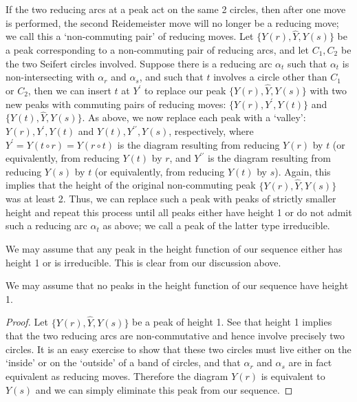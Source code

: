 If the two reducing arcs at a peak act on the same 2 circles, then after one move is performed, the second Reidemeister move will no longer be a reducing move; we call this a ‘non-commuting pair’ of reducing moves. Let $\{Y(r), \hat{Y}, Y(s) \}$ be a peak corresponding to a non-commuting pair of reducing arcs, and let $C_1, C_2$ be the two Seifert circles involved. Suppose there is a reducing arc $\alpha_t$ such that $\alpha_t$ is non-intersecting with $\alpha_r$ and $\alpha_s$, and such that $t$ involves a circle other than $C_1$ or $C_2$, then we can insert $t$ at $Y^{\prime}$ to replace our peak $\{Y(r), \hat{Y}, Y(s) \}$  with two new peaks with commuting pairs of reducing moves: $\{Y(r), Y^{\prime}, Y(t)\}$ and $\{Y (t), \hat{Y}, Y (s)\}$.
As above, we now replace each peak with a ‘valley’: ${Y (r), Y^{\prime}, Y (t)}$ and ${Y (t), Y^{\prime\prime}, Y (s)}$, respectively, where $Y^{\prime}= Y (t \circ r) = Y (r \circ t)$ is the diagram resulting from reducing $Y(r)$ by
$t$ (or equivalently, from reducing $Y(t)$ by $r$, and $Y^{\prime\prime}$ is the diagram resulting from reducing $Y(s)$ by $t$ (or equivalently, from reducing $Y(t)$ by $s$). Again, this implies that the height of the original non-commuting peak $\{Y (r), \hat{Y}, Y (s)\}$ was at least 2. Thus, we can replace such a peak with peaks of strictly smaller height and repeat this process until all peaks either have height 1 or do not admit such a reducing arc $\alpha_t$ as above; we call a peak of the latter type irreducible.

We may assume that any peak in the height function of our sequence either
has height 1 or is irreducible. This is clear from our discussion above.

\begin{lemma}
\label{sec:markovs-theorem-2}
We may assume that no peaks in the height function of our sequence have
height 1.
\end{lemma}

\begin{proof}
\label{sec:markovs-theorem-3}
Let $\{Y(r), \hat{Y}, Y(s)\}$ be a peak of height 1. See that height 1 implies that the two reducing arcs are non-commutative and hence involve precisely two circles. It is an easy exercise to show that these two circles must live either on the ‘inside’ or on the ‘outside’ of a band of circles, and that $\alpha_r$ and $\alpha_s$ are in fact equivalent as reducing moves.
Therefore the diagram $Y(r)$ is equivalent to $Y(s)$ and we can simply eliminate this peak from our sequence.
\end{proof}

